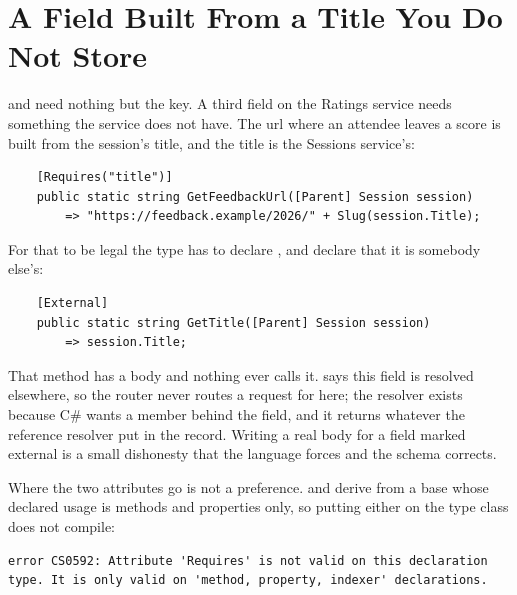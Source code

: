 \section{A Field Built From a Title You Do Not Store}
\label{sec:ch09-a-field-built-from-a-title}

%
 and  need nothing but the key. A third
field on the Ratings service needs something the service does not have. The
url where an attendee leaves a score is built from the session's title, and the
title is the Sessions service's:

\begin{verbatim}
    [Requires("title")]
    public static string GetFeedbackUrl([Parent] Session session)
        => "https://feedback.example/2026/" + Slug(session.Title);
\end{verbatim}

%
For that to be legal the type has to declare , and declare that it
is somebody else's:

\begin{verbatim}
    [External]
    public static string GetTitle([Parent] Session session)
        => session.Title;
\end{verbatim}

%
That method has a body and nothing ever calls it.  says this
field is resolved elsewhere, so the router never routes a request for
 here; the resolver exists because C\# wants a member
behind the field, and it returns whatever the reference resolver put in the
record. Writing a real body for a field marked external is a small dishonesty
that the language forces and the schema corrects.

%
Where the two attributes go is not a preference. \code{[Requires]} and
\code{[Provides]} derive from a base whose declared usage is methods and
properties only, so putting either on the type class does not compile:

\begin{verbatim}
error CS0592: Attribute 'Requires' is not valid on this declaration type. It is only valid on 'method, property, indexer' declarations.
\end{verbatim}

